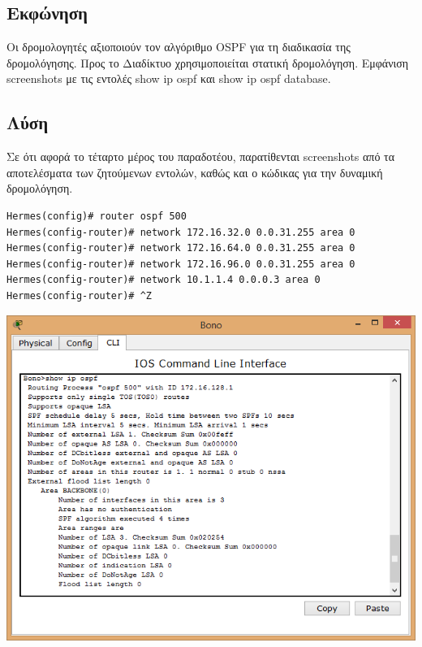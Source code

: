 \documentclass{assignment}
\begin{document}
\subsection*{Εκφώνηση}

Οι δρομολογητές αξιοποιούν τον αλγόριθμο OSPF για τη διαδικασία της δρομολόγησης. 
Προς το Διαδίκτυο χρησιμοποιείται στατική δρομολόγηση. Εμφάνιση screenshots με
τις εντολές show ip ospf και show ip ospf database.

\subsection*{Λύση}
Σε ότι αφορά το τέταρτο μέρος του παραδοτέου, παρατίθενται screenshots από
τα αποτελέσματα των ζητούμενων εντολών, καθώς και ο κώδικας για την δυναμική
δρομολόγηση.
\begin{verbatim}
Hermes(config)# router ospf 500
Hermes(config-router)# network 172.16.32.0 0.0.31.255 area 0
Hermes(config-router)# network 172.16.64.0 0.0.31.255 area 0
Hermes(config-router)# network 172.16.96.0 0.0.31.255 area 0
Hermes(config-router)# network 10.1.1.4 0.0.0.3 area 0
Hermes(config-router)# ^Z
\end{verbatim}
\begin{center}
\includegraphics[width=\textwidth, height=\textheight, keepaspectratio]{images/ipsopf.png}
\end{center}
\end{document}
